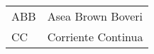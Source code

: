 \chapter*{\notationname}
\pagestyle{especial}
\chaptermark{\notationname}
{}
\begin{longtable}{p{3cm}p{8.5cm}}

ABB & Asea Brown Boveri \\

CC & Corriente Continua \\


\end{longtable}
